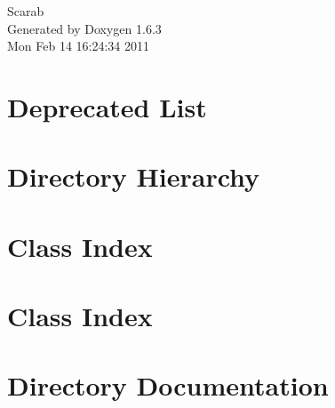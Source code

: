 \documentclass[a4paper]{book}
\begin{document}
\hypersetup{pageanchor=false}
\begin{titlepage}
\vspace*{7cm}
\begin{center}
{\Large Scarab }\\
\vspace*{1cm}
{\large Generated by Doxygen 1.6.3}\\
\vspace*{0.5cm}
{\small Mon Feb 14 16:24:34 2011}\\
\end{center}
\end{titlepage}
\clearemptydoublepage
{}
\tableofcontents
\clearemptydoublepage
{}
\hypersetup{pageanchor=true}
\chapter{Deprecated List}
\label{deprecated}
\hypertarget{deprecated}{}

\chapter{Directory Hierarchy}

\chapter{Class Index}

\chapter{Class Index}

\chapter{Directory Documentation}










\end{document}
